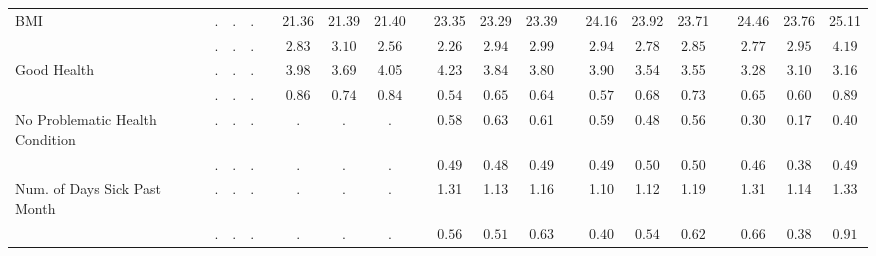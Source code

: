 \begin{center}
{\begin{longtable}{L{5cm} c c c p{.5cm} c c c p{.5cm} c c c p{.5cm} c c c p{.5cm} c c c}
 \quad BMI & . &         . &         . & &     21.36 &     21.39 &     21.40 & &     23.35 &     23.29 &     23.39 & &     24.16 &     23.92 &     23.71 & &     24.46 &     23.76 &     25.11 \\*
 \quad & $\mathit{        .}$ & $\mathit{        .}$ & $\mathit{        .}$ & & $\mathit{     2.83}$ & $\mathit{     3.10}$ & $\mathit{     2.56}$ & & $\mathit{     2.26}$ & $\mathit{     2.94}$ & $\mathit{     2.99}$ & & $\mathit{     2.94}$ & $\mathit{     2.78}$ & $\mathit{     2.85}$ & & $\mathit{     2.77}$ & $\mathit{     2.95}$ & $\mathit{     4.19}$ \\[.2em]
 \quad Good Health & . &         . &         . & &      3.98 &      3.69 &      4.05 & &      4.23 &      3.84 &      3.80 & &      3.90 &      3.54 &      3.55 & &      3.28 &      3.10 &      3.16 \\*
 \quad & $\mathit{        .}$ & $\mathit{        .}$ & $\mathit{        .}$ & & $\mathit{     0.86}$ & $\mathit{     0.74}$ & $\mathit{     0.84}$ & & $\mathit{     0.54}$ & $\mathit{     0.65}$ & $\mathit{     0.64}$ & & $\mathit{     0.57}$ & $\mathit{     0.68}$ & $\mathit{     0.73}$ & & $\mathit{     0.65}$ & $\mathit{     0.60}$ & $\mathit{     0.89}$ \\[.2em]
 \quad No Problematic Health Condition & . &         . &         . & &         . &         . &         . & &      0.58 &      0.63 &      0.61 & &      0.59 &      0.48 &      0.56 & &      0.30 &      0.17 &      0.40 \\*
 \quad & $\mathit{        .}$ & $\mathit{        .}$ & $\mathit{        .}$ & & $\mathit{        .}$ & $\mathit{        .}$ & $\mathit{        .}$ & & $\mathit{     0.49}$ & $\mathit{     0.48}$ & $\mathit{     0.49}$ & & $\mathit{     0.49}$ & $\mathit{     0.50}$ & $\mathit{     0.50}$ & & $\mathit{     0.46}$ & $\mathit{     0.38}$ & $\mathit{     0.49}$ \\[.2em]
 \quad Num. of Days Sick Past Month & . &         . &         . & &         . &         . &         . & &      1.31 &      1.13 &      1.16 & &      1.10 &      1.12 &      1.19 & &      1.31 &      1.14 &      1.33 \\*
 \quad & $\mathit{        .}$ & $\mathit{        .}$ & $\mathit{        .}$ & & $\mathit{        .}$ & $\mathit{        .}$ & $\mathit{        .}$ & & $\mathit{     0.56}$ & $\mathit{     0.51}$ & $\mathit{     0.63}$ & & $\mathit{     0.40}$ & $\mathit{     0.54}$ & $\mathit{     0.62}$ & & $\mathit{     0.66}$ & $\mathit{     0.38}$ & $\mathit{     0.91}$ \\[.2em]

\end{longtable}}
\end{center}
